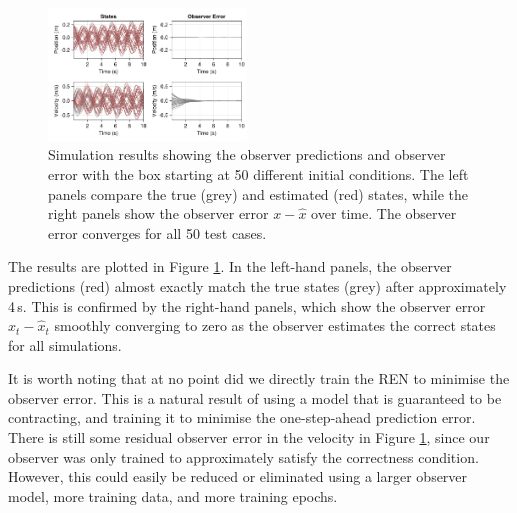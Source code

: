 \begin{figure}
    \centering
    \includegraphics[width=0.47\textwidth]{Images/ren_box_obsv.pdf}
    \caption{Simulation results showing the observer predictions and observer error with the box starting at 50 different initial conditions. The left panels compare the true (grey) and estimated (red) states, while the right panels show the observer error $x - \hat{x}$ over time. The observer error converges for all 50 test cases.}
    \label{fig:observer-results}
\end{figure}

The results are plotted in Figure \ref{fig:observer-results}. In the left-hand panels, the observer predictions (red) almost exactly match the true states (grey) after approximately 4\,s. This is confirmed by the right-hand panels, which show the observer error $x_t - \hat{x}_t$ smoothly converging to zero as the observer estimates the correct states for all simulations. 

It is worth noting that at no point did we directly train the REN to minimise the observer error. This is a natural result of using a model that is guaranteed to be contracting, and training it to minimise the one-step-ahead prediction error. There is still some residual observer error in the velocity in Figure \ref{fig:observer-results}, since our observer was only trained to approximately satisfy the correctness condition. However, this could easily be reduced or eliminated using a larger observer model, more training data, and more training epochs.